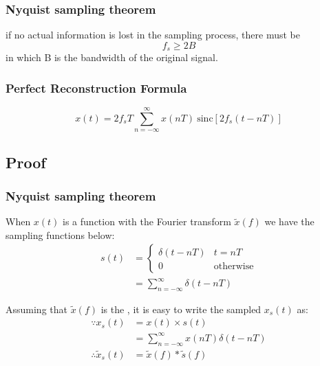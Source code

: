 \documentclass{article}
\begin{document}
\subsubsection*{Nyquist sampling theorem}

if no actual information is lost in the sampling process, there must be
\begin{equation}
    f_s \geq 2B
\end{equation}
in which B is the bandwidth of the original signal.

\subsubsection*{Perfect Reconstruction Formula}
\begin{equation}
    x(t) = 2f_s T \sum_{n = -\infty}^{\infty} x(nT) ~ \mathrm{sinc} \left[ 2f_s (t - nT) \right]
\end{equation}
\subsection{Proof}
\subsubsection*{Nyquist sampling theorem}

When $x(t)$ is a function with the Fourier transform $\widetilde{x}(f)$
we have the sampling functions below:
\begin{align}
    s(t) &= 
    \left\{ 
        \begin{array}{lr}
            \delta(t - nT) & t = nT\\
            0 & \mathrm{otherwise}
        \end{array}
    \right. \nonumber \\
    &= \sum_{n = -\infty}^{\infty} \delta(t - nT)
\end{align}

Assuming that $\widetilde{x}(f)$ is the , it is easy to write the sampled $x_s(t)$ as:
\begin{align}
    \because x_s(t) &= x(t)\times s(t) \nonumber \\
    &= \sum_{n = -\infty}^{\infty} x(nT) \delta(t - nT) \label{xst} \\
    \therefore \widetilde{x}_s(t) &= \widetilde{x}(f) * \widetilde{s}(f) \label{xn}
\end{align}
\end{document}
